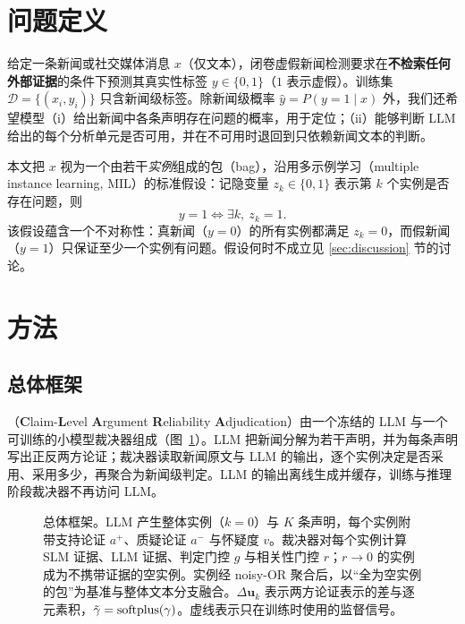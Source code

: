 \section{问题定义}\label{sec:problem}

给定一条新闻或社交媒体消息 $x$（仅文本），闭卷虚假新闻检测要求在\textbf{不检索任何外部证据}的条件下预测其真实性标签 $y\in\{0,1\}$（$1$ 表示虚假）。训练集 $\mathcal{D}=\{(x_i,y_i)\}$ 只含新闻级标签。除新闻级概率 $\hat y=P(y{=}1\mid x)$ 外，我们还希望模型（i）给出新闻中各条声明存在问题的概率，用于定位；（ii）能够判断 LLM 给出的每个分析单元是否可用，并在不可用时退回到只依赖新闻文本的判断。

本文把 $x$ 视为一个由若干\emph{实例}组成的包（bag），沿用多示例学习（multiple instance learning, MIL）的标准假设\citep{dietterich1997solving,carbonneau2018mil}：记隐变量 $z_k\in\{0,1\}$ 表示第 $k$ 个实例是否存在问题，则
\begin{equation}
y=1 \iff \exists k,\ z_k=1 .\label{eq:mil}
\end{equation}
该假设蕴含一个不对称性：真新闻（$y{=}0$）的所有实例都满足 $z_k{=}0$，而假新闻（$y{=}1$）只保证至少一个实例有问题。假设何时不成立见 \ref{sec:discussion} 节的讨论。

\section{方法}\label{sec:method}

\subsection{总体框架}

\method{}（\textbf{C}laim-\textbf{L}evel \textbf{A}rgument \textbf{R}eliability \textbf{A}djudication）由一个冻结的 LLM 与一个可训练的小模型裁决器组成（图~\ref{fig:framework}）。LLM 把新闻分解为若干声明，并为每条声明写出正反两方论证；裁决器读取新闻原文与 LLM 的输出，逐个实例决定是否采用、采用多少，再聚合为新闻级判定。LLM 的输出离线生成并缓存，训练与推理阶段裁决器不再访问 LLM。

\begin{figure}[!htbp]
\centering
\resizebox{\linewidth}{!}{}
\caption{\method{} 总体框架。LLM 产生整体实例（$k{=}0$）与 $K$ 条声明，每个实例附带支持论证 $a^+$、质疑论证 $a^-$ 与怀疑度 $v$。裁决器对每个实例计算 SLM 证据、LLM 证据、判定门控 $g$ 与相关性门控 $r$；$r\to0$ 的实例成为不携带证据的空实例。实例经 noisy-OR 聚合后，以“全为空实例的包”为基准与整体文本分支融合。$\Delta\bm u_k$ 表示两方论证表示的差与逐元素积，$\tilde\gamma=\operatorname{softplus}(\gamma)$。虚线表示只在训练时使用的监督信号。}
\label{fig:framework}
\end{figure}

